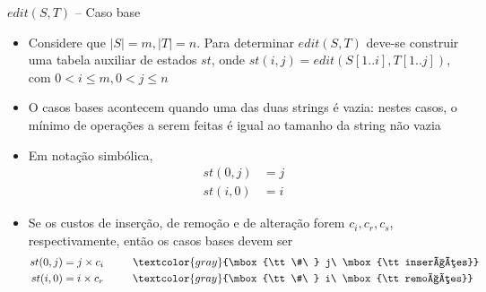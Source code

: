 \begin{frame}[fragile]{$edit(S, T)$ -- Caso base}

    \begin{itemize}
        \item Considere que $|S| = m, |T| = n$. Para determinar $edit(S, T)$ deve-se construir uma 
        tabela auxiliar de estados $st$, onde $st(i, j) = edit(S[1..i], T[1..j])$, com 
        $0 < i \leq m, 0 < j \leq n$
        \pause

        \item O casos bases acontecem quando uma das duas strings é vazia: nestes casos, o mínimo 
            de operações a serem feitas é igual  ao tamanho 
            da string não vazia
        \pause

        \item Em notação simbólica,
        \begin{align*}
            st(0, j) &= j \\
            st(i, 0) &= i
        \end{align*}
        \pause

        \item Se os custos de inserção, de remoção e de alteração forem $c_i, c_r, c_s$, 
            respectivamente, então os casos bases devem ser
        \begin{align*}
            st(0, j) &= j\times c_i \ \ \ \ \ \ \ \ \textcolor{gray}{\mbox{\tt \#\ } j\ \mbox{\tt inserções}}\\
            st(i, 0) &= i\times c_r \ \ \ \ \ \ \ \ \textcolor{gray}{\mbox{\tt \#\ } i\ \mbox{\tt remoções}}
        \end{align*}
    \end{itemize}

\end{frame}

